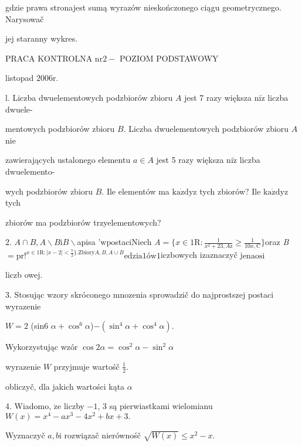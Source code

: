 \documentclass[a4paper,12pt]{article}
\begin{document}
gdzie prawa stronajest sumą wyrazów nieskończonego ciągu geometrycznego. Narysowač

jej staranny wykres.





PRACA KONTROLNA $\mathrm{n}\mathrm{r}2-$ POZIOM PODSTAWOWY

listopad $2006\mathrm{r}.$

l. Liczba dwuelementowych podzbiorów zbioru $A$ jest 7 razy większa $\mathrm{n}\mathrm{i}\dot{\mathrm{z}}$ liczba dwuele-

mentowych podzbiorów zbioru $B$. Liczba dwuelementowych podzbiorów zbioru $A$ nie

zawierających ustalonego elementu $a\in A$ jest 5 razy większa $\mathrm{n}\mathrm{i}\dot{\mathrm{z}}$ liczba dwuelemento-

wych podzbiorów zbioru $B$. Ile elementów ma $\mathrm{k}\mathrm{a}\dot{\mathrm{z}}\mathrm{d}\mathrm{y}\mathrm{z}$ tych zbiorów? Ile $\mathrm{k}\mathrm{a}\dot{\mathrm{z}}\mathrm{d}\mathrm{y}\mathrm{z}$ tych

zbiorów ma podzbiorów trzyelementowych?

2. $A\cap B, A\backslash B\mathrm{i}B\backslash $apisa '$\mathrm{w}\mathrm{p}$ostaciNiech {\it A}$=\displaystyle \{x\in 1\mathrm{R}:\frac{1}{x^{2}+23,A\mathrm{z}}\geq\frac{1}{10x,\mathrm{C}}\}$oraz {\it B}$=\mathrm{p}\mathrm{r}!^{x\in 1\mathrm{R}:|x-2|<\frac{7}{2}\}.\mathrm{Z}\mathrm{b}\mathrm{i}\mathrm{o}\mathrm{r}\mathrm{y}A,B,A\cup B}\mathrm{e}\mathrm{d}\mathrm{z}\mathrm{i}\mathrm{a}1\text{ó} \mathrm{w}1$iczbowych izaznaczyč j$\mathrm{e}\mathrm{n}\mathrm{a}\mathrm{o}\mathrm{s}\mathrm{i}$

liczb owej.

3. Stosując wzory skróconego mnozenia sprowadzič do najprostszej postaci wyrazenie

$W=2$ (sin6 $\alpha+\cos^{6}\alpha$)$-(\sin^{4}\alpha+\cos^{4}\alpha).$

Wykorzystując wzór $\cos 2\alpha = \cos^{2}\alpha-\sin^{2}\alpha$

wyrazenie $W$ przyjmuje wartośč $\displaystyle \frac{1}{2}.$

obliczyč, dla jakich wartości kąta $\alpha$

4. Wiadomo, $\dot{\mathrm{z}}\mathrm{e}$ liczby $-1$, 3 są pierwiastkami wielomianu $W(x)=x^{4}-ax^{3}-4x^{2}+bx+3.$

Wyznaczyč $a, b\mathrm{i}$ rozwiązač nierównośč $\sqrt{W(x)}\leq x^{2}-x.$
\end{document}
